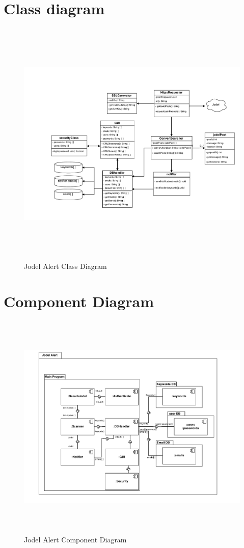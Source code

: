 \documentclass[a4paper,12pt]{article}
\begin{document}
\section{Class diagram}
\begin{figure}[!h]
	\centering
	\includegraphics[height=12cm]{img/jodelUMLClassDiagram.pdf}
	\caption{Jodel Alert Class Diagram}
	\label{Jodel}
\end{figure}
\clearpage
\section{Component Diagram}
\begin{figure}[!h]
	\centering
	\includegraphics[height=11cm]{img/component_diagram.pdf}
	\caption{Jodel Alert Component Diagram}
	\label{Jodel}
\end{figure}
\clearpage
\end{document}
